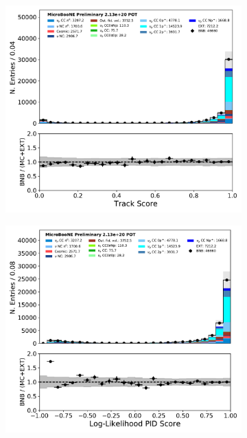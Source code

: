 \begin{figure}[H]
    \centering
        \begin{subfigure}[b]{0.3\textwidth}
        \centering
        \includegraphics[width=\textwidth]{NuMuCCsel/Images/Ryan/appendix_muonsel_input_R3/trk_score_v_07232020_presel_samples_detsys_event_category.pdf}
        \end{subfigure}
        \begin{subfigure}[b]{0.3\textwidth}
        \centering
        \includegraphics[width=\textwidth]{NuMuCCsel/Images/Ryan/appendix_muonsel_input_R3/trk_llr_pid_score_v_07232020_presel_samples_detsys_event_category.pdf}

\end{subfigure}
\end{figure}
